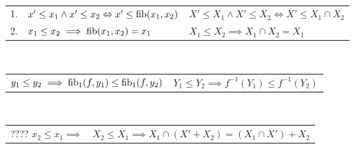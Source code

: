 \begin{lemm}[Regel (k)]
\ \linebreak

\begin{tabular}{rll}
   1.
&  $x' \leq x_1 \wedge x' \leq x_2 \Leftrightarrow x' \leq \operatorname{fib}(x_1,x_2)$
&  $X' \leq X_1 \wedge X' \leq X_2 \Leftrightarrow X' \leq X_1 \cap X_2$
\\ 2.
&  $x_1\leq x_2 \implies \operatorname{fib}(x_1,x_2)  = x_1$
&  $X_1 \leq X_2 \implies X_1 \cap X_2 = X_1$
\end{tabular}
\end{lemm}

\begin{lemm}[Regel (l)]
\ \linebreak

\begin{tabular}{ll}
   $y_1 \leq y_2 \implies \operatorname{fib}_1(f,y_1) \leq \operatorname{fib}_1(f,y_2)$
&  $Y_1 \leq Y_2 \implies f^{-1}(Y_1) \leq f^{-1}(Y_2)$
\end{tabular}
\end{lemm}

\begin{lemm}[Regel (m)]
\ \linebreak

\begin{tabular}{ll}
????
   $x_2 \leq x_1 \implies $
&  $X_2 \leq X_1 \implies X_1 \cap (X'+X_2) = (X_1\cap X') + X_2$
\end{tabular}
\end{lemm}
